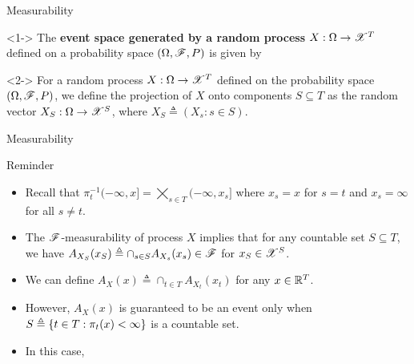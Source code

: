 \documentclass[12pt,aspectratio=169]{beamer}
\begin{document}
\begin{frame}{Measurability}
\begin{Definition}<1-> 
The \textbf{event space generated by a random process} $X: \Omega\to\mathscr{X}^T$ defined on a probability space $(\Omega,\mathscr{F},P)$ is given by 
\end{Definition}
\begin{Definition}<2->
For a random process $X:\Omega \to \mathscr{X}^T$ defined on the probability space $(\Omega,\mathscr{F},P)$,  
we define the projection of $X$ onto components $S \subseteq T$ as the random vector $X_S: \Omega \to \mathscr{X}^S$, where $X_S \triangleq (X_s: s \in S)$.
\end{Definition}
\end{frame}

\begin{frame}{Measurability}
\begin{block}{Reminder}
\begin{itemize}
\item <1-> Recall that $\pi_t^{-1}(-\infty, x] = \bigtimes_{s \in T}(-\infty, x_s]$ where $x_s = x$ for $s = t$ and $x_s = \infty$ for all $s\neq t$. 
\item <2-> The $\mathscr{F}$-measurability of process $X$ implies that for any countable set $S \subseteq T$, 
we have $A_{X_S}(x_S) \triangleq \cap_{s \in S}A_{X_s}(x_s) \in \mathscr{F}$ for $x_S \in \mathscr{X}^S$. 
\item <3-> We can define $A_X(x) \triangleq \cap_{t \in T}A_{X_t}(x_t)$ for any $x \in \mathbb{R}^T$. 
\item <4-> However, $A_X(x)$ is guaranteed to be an event only when $S \triangleq \left\{t \in T: \pi_t(x) < \infty\right\}$ is a countable set. 
\item <5-> In this case, 
\end{itemize}
\end{block}
\end{frame}
\end{document}
